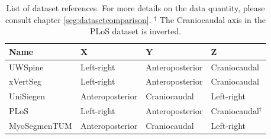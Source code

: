 \begin{table}
 
    \begin{tabular}{ l l l l} 
     \hline
     \hline
     Name & X & Y & Z \\
     \hline 
    UWSpine & Left-right & Anteroposterior & Craniocaudal \\
    xVertSeg & Left-right & Anteroposterior & Craniocaudal \\
    UniSiegen  &  Anteroposterior & Craniocaudal & Left-right \\
    PLoS & Left-right & Anteroposterior & Craniocaudal$^\dagger$ \\
    MyoSegmenTUM &  Anteroposterior & Craniocaudal & Left-right \\
     \hline
     \hline
    \end{tabular}
    \caption{List of dataset references. For more details on the data quantity, please consult chapter \ref{seg:datasetcomparison}. 
    $^\dagger$ The Craniocaudal axis in the PLoS dataset is inverted.}

\end{table}

